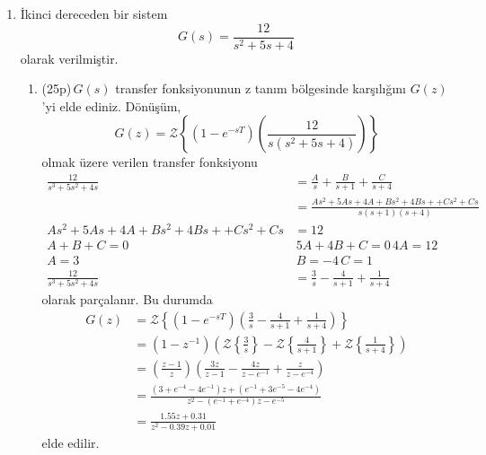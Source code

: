 \begin{enumerate}[\bfseries S1.]
    \item İkinci dereceden bir sistem
    \begin{equation}
        G(s)=\frac{12}{s^2+5s+4}
    \end{equation}
    olarak verilmiştir.
    \begin{enumerate}
        \item(25p)\,$G(s)$ transfer fonksiyonunun z tanım bölgesinde karşılığını $G(z)$'yi elde ediniz. 
        Dönüşüm,
        \begin{equation}
            G(z)=\mathcal{Z}\left\{(1-e^{-sT})\left(\frac{12}{s(s^2+5s+4)}\right)\right\}
        \end{equation}
        olmak üzere verilen transfer fonksiyonu
        \begin{equation}
        \begin{split}
            \frac{12}{s^3+5s^2+4s}&=\frac{A}{s}+\frac{B}{s+1}+\frac{C}{s+4}\\
            &=\frac{As^2+5As+4A+Bs^2+4Bs++Cs^2+Cs}{s(s+1)(s+4)}\\
            As^2+5As+4A+Bs^2+4Bs++Cs^2+Cs&=12\\
            A+B+C=0\,&\,5A+4B+C=0\,4A=12\\
            A=3\,&\,B=-4\,C=1\\
            \frac{12}{s^3+5s^2+4s}&=\frac{3}{s}-\frac{4}{s+1}+\frac{1}{s+4}
        \end{split}
        \end{equation}
        olarak parçalanır. Bu durumda
        \begin{equation}
        \begin{split}
            G(z)&=\mathcal{Z}\left\{(1-e^{-sT})\left(\frac{3}{s}-\frac{4}{s+1}+\frac{1}{s+4}\right)\right\}\\
            &=\left(1-z^{-1}\right)\left(\mathcal{Z}\left\{\frac{3}{s}\right\}-\mathcal{Z}\left\{\frac{4}{s+1}\right\}+\mathcal{Z}\left\{\frac{1}{s+4}\right\}\right)\\
            &=\left(\frac{z-1}{z}\right)\left(\frac{3z}{z-1}-\frac{4z}{z-e^{-1}}+\frac{z}{z-e^{-4}}\right)\\
            &=\frac{(3+e^{-4}-4e^{-1})z+(e^{-1}+3e^{-5}-4e^{-4})}{z^2-(e^{-1}+e^{-4})z-e^{-5}}\\
            &=\frac{1.55z+0.31}{z^2-0.39z+0.01}
        \end{split}
        \end{equation}
        elde edilir.


\end{enumerate}
\end{enumerate}

